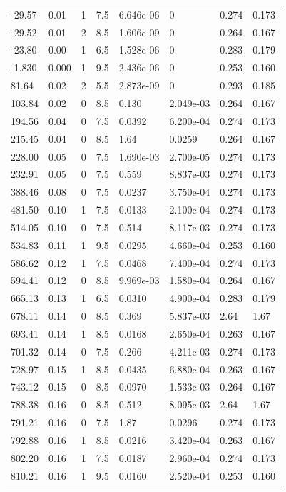 \documentclass[preview]{standalone}
\begin{document}
{{\begin{tabular}{L{1.2cm}C{1.2cm} C{0.3cm}C{0.5cm} C{1.4cm}C{1.4cm} C{1.4cm}C{1.4cm}}
  -29.57  &  0.01  & 1     & 7.5 &  6.646e-06  & 0  & 0.274 &  0.173   \\ 
  -29.52  &  0.01  & 2     & 8.5 &  1.606e-09  & 0  & 0.264 &  0.167   \\ 
  -23.80  &  0.00  & 1     & 6.5 &  1.528e-06  & 0  & 0.283 &  0.179   \\ 
  -1.830  &  0.000  & 1     & 9.5 &  2.436e-06  & 0  & 0.253 &  0.160   \\ 
  81.64  &  0.02  & 2     & 5.5 &  2.873e-09  & 0  & 0.293 &  0.185   \\ 
  103.84  &  0.02  & 0     & 8.5 &  0.130  & 2.049e-03  & 0.264 &  0.167   \\ 
  194.56  &  0.04  & 0     & 7.5 &  0.0392  & 6.200e-04  & 0.274 &  0.173   \\ 
  215.45  &  0.04  & 0     & 8.5 &  1.64  & 0.0259  & 0.264 &  0.167   \\ 
  228.00  &  0.05  & 0     & 7.5 &  1.690e-03  & 2.700e-05  & 0.274 &  0.173   \\ 
  232.91  &  0.05  & 0     & 7.5 &  0.559  & 8.837e-03  & 0.274 &  0.173   \\ 
  388.46  &  0.08  & 0     & 7.5 &  0.0237  & 3.750e-04  & 0.274 &  0.173   \\ 
  481.50  &  0.10  & 1     & 7.5 &  0.0133  & 2.100e-04  & 0.274 &  0.173   \\ 
  514.05  &  0.10  & 0     & 7.5 &  0.514  & 8.117e-03  & 0.274 &  0.173   \\ 
  534.83  &  0.11  & 1     & 9.5 &  0.0295  & 4.660e-04  & 0.253 &  0.160   \\ 
  586.62  &  0.12  & 1     & 7.5 &  0.0468  & 7.400e-04  & 0.274 &  0.173   \\ 
  594.41  &  0.12  & 0     & 8.5 &  9.969e-03  & 1.580e-04  & 0.264 &  0.167   \\ 
  665.13  &  0.13  & 1     & 6.5 &  0.0310  & 4.900e-04  & 0.283 &  0.179   \\ 
  678.11  &  0.14  & 0     & 8.5 &  0.369  & 5.837e-03  & 2.64 &  1.67   \\ 
  693.41  &  0.14  & 1     & 8.5 &  0.0168  & 2.650e-04  & 0.263 &  0.167   \\ 
  701.32  &  0.14  & 0     & 7.5 &  0.266  & 4.211e-03  & 0.274 &  0.173   \\ 
  728.97  &  0.15  & 1     & 8.5 &  0.0435  & 6.880e-04  & 0.263 &  0.167   \\ 
  743.12  &  0.15  & 0     & 8.5 &  0.0970  & 1.533e-03  & 0.264 &  0.167   \\ 
  788.38  &  0.16  & 0     & 8.5 &  0.512  & 8.095e-03  & 2.64 &  1.67   \\ 
  791.21  &  0.16  & 0     & 7.5 &  1.87  & 0.0296  & 0.274 &  0.173   \\ 
  792.88  &  0.16  & 1     & 8.5 &  0.0216  & 3.420e-04  & 0.263 &  0.167   \\ 
  802.20  &  0.16  & 1     & 7.5 &  0.0187  & 2.960e-04  & 0.274 &  0.173   \\ 
  810.21  &  0.16  & 1     & 9.5 &  0.0160  & 2.520e-04  & 0.253 &  0.160   \\ 
\hline 
\end{tabular} 

}}
\end{document}
